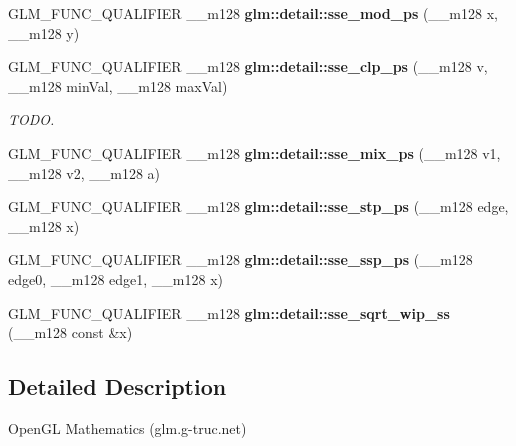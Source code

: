 \begin{DoxyCompactItemize}
\item 
\hypertarget{namespaceglm_1_1detail_a5a9835edaca654da44c7daae89ce5106}{G\-L\-M\-\_\-\-F\-U\-N\-C\-\_\-\-Q\-U\-A\-L\-I\-F\-I\-E\-R \-\_\-\-\_\-m128 {\bfseries glm\-::detail\-::sse\-\_\-mod\-\_\-ps} (\-\_\-\-\_\-m128 x, \-\_\-\-\_\-m128 y)}\label{namespaceglm_1_1detail_a5a9835edaca654da44c7daae89ce5106}

\item 
\hypertarget{namespaceglm_1_1detail_a7449dbce48a49880189874273179f3d2}{G\-L\-M\-\_\-\-F\-U\-N\-C\-\_\-\-Q\-U\-A\-L\-I\-F\-I\-E\-R \-\_\-\-\_\-m128 {\bfseries glm\-::detail\-::sse\-\_\-clp\-\_\-ps} (\-\_\-\-\_\-m128 v, \-\_\-\-\_\-m128 min\-Val, \-\_\-\-\_\-m128 max\-Val)}\label{namespaceglm_1_1detail_a7449dbce48a49880189874273179f3d2}

\begin{DoxyCompactList}\small\item\em T\-O\-D\-O. \end{DoxyCompactList}\item 
\hypertarget{namespaceglm_1_1detail_af1b5b805a3dd439d6fbe92033f4d3bbd}{G\-L\-M\-\_\-\-F\-U\-N\-C\-\_\-\-Q\-U\-A\-L\-I\-F\-I\-E\-R \-\_\-\-\_\-m128 {\bfseries glm\-::detail\-::sse\-\_\-mix\-\_\-ps} (\-\_\-\-\_\-m128 v1, \-\_\-\-\_\-m128 v2, \-\_\-\-\_\-m128 a)}\label{namespaceglm_1_1detail_af1b5b805a3dd439d6fbe92033f4d3bbd}

\item 
\hypertarget{namespaceglm_1_1detail_a7287773c37d9f5900db40f7a783f689c}{G\-L\-M\-\_\-\-F\-U\-N\-C\-\_\-\-Q\-U\-A\-L\-I\-F\-I\-E\-R \-\_\-\-\_\-m128 {\bfseries glm\-::detail\-::sse\-\_\-stp\-\_\-ps} (\-\_\-\-\_\-m128 edge, \-\_\-\-\_\-m128 x)}\label{namespaceglm_1_1detail_a7287773c37d9f5900db40f7a783f689c}

\item 
\hypertarget{namespaceglm_1_1detail_a66b096ea09da5b585484550d41da1580}{G\-L\-M\-\_\-\-F\-U\-N\-C\-\_\-\-Q\-U\-A\-L\-I\-F\-I\-E\-R \-\_\-\-\_\-m128 {\bfseries glm\-::detail\-::sse\-\_\-ssp\-\_\-ps} (\-\_\-\-\_\-m128 edge0, \-\_\-\-\_\-m128 edge1, \-\_\-\-\_\-m128 x)}\label{namespaceglm_1_1detail_a66b096ea09da5b585484550d41da1580}

\item 
G\-L\-M\-\_\-\-F\-U\-N\-C\-\_\-\-Q\-U\-A\-L\-I\-F\-I\-E\-R \-\_\-\-\_\-m128 {\bfseries glm\-::detail\-::sse\-\_\-sqrt\-\_\-wip\-\_\-ss} (\-\_\-\-\_\-m128 const \&x)
\end{DoxyCompactItemize}


\subsection{Detailed Description}
Open\-G\-L Mathematics (glm.\-g-\/truc.\-net)

